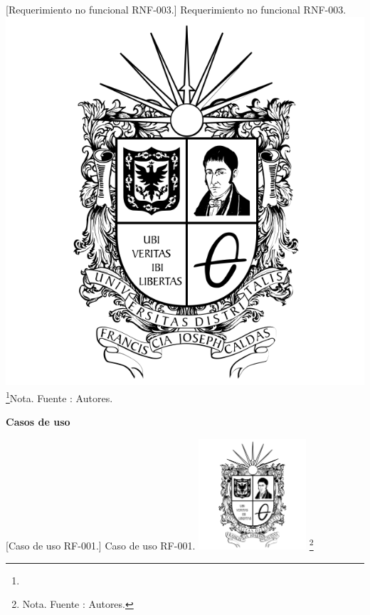 \begin{itemize}
{\begin{enumerate}
        \vspace{2mm}
        \begin{minipage}{0.9\textwidth}
        \centering
        [{Requerimiento no funcional RNF-003.}]{ Requerimiento no funcional RNF-003. }
        \label{reqnf3}
        \includegraphics[width=1\textwidth]{Content/Images/Escudo_UD.png}
        \footnote{}{Nota. \textup{Fuente : Autores.}}
        \end{minipage}
        
\end{enumerate}

\textbf{Casos de uso}
    
    \vspace{2mm}
    \begin{minipage}{0.9\textwidth}
    \centering
    [{Caso de uso RF-001.}]{ Caso de uso RF-001. }
    \label{caso1}
    \includegraphics[width=0.3\textwidth]{Content/Images/Escudo_UD.png}
    \footnote{Nota. \textup{Fuente : Autores.}}
    \end{minipage}
    
}
\end{itemize}
